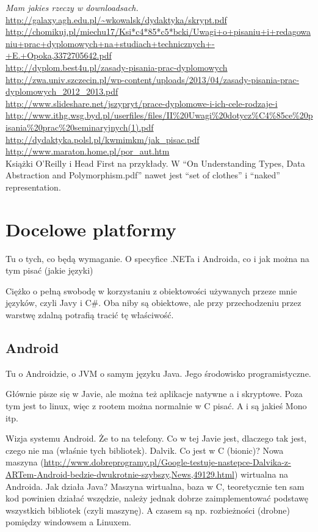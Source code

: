 \emph{Mam jakies rzeczy w downloadsach.} \\
\url{http://galaxy.agh.edu.pl/~wkowalsk/dydaktyka/skrypt.pdf}\\
\url{http://chomikuj.pl/miechu17/Ksi*c4*85*c5*bcki/Uwagi+o+pisaniu+i+redagowaniu+prac+dyplomowych+na+studiach+technicznych+-+E.+Opoka,3372705642.pdf}\\
\url{http://dyplom.best4u.pl/zasady-pisania-prac-dyplomowych}\\
\url{http://zwa.univ.szczecin.pl/wp-content/uploads/2013/04/zasady-pisania-prac-dyplomowych_2012_2013.pdf}\\
\url{http://www.slideshare.net/jszypryt/prace-dyplomowe-i-ich-cele-rodzaje-i}\\
\url{http://www.ithg.wsg.byd.pl/userfiles/files/II%20Uwagi%20dotycz%C4%85ce%20pisania%20prac%20seminaryjnych(1).pdf}\\
\url{http://dydaktyka.polsl.pl/kwmimkm/jak_pisac.pdf}\\
\url{http://www.maraton.home.pl/por_aut.htm}\\

Książki O'Reilly i Head First na przykłady. W ``On Understanding Types, Data Abstraction and Polymorphism.pdf'' nawet jest ``set of clothes'' i ``naked'' representation.

\section{Docelowe platformy}
Tu o tych, co będą wymaganie. O specyfice .NETa i Androida, co i jak można na tym pisać (jakie języki)

Ciężko o pełną swobodę w korzystaniu z obiektowości używanych przeze mnie języków, czyli Javy i C\#. Oba niby są obiektowe, ale przy przechodzeniu przez warstwę zdalną potrafią tracić tę właściwość.

\subsection{Android}
Tu o Androidzie, o JVM o samym języku Java. Jego środowisko programistyczne.

Głównie pisze się w Javie, ale można też aplikacje natywne a i skryptowe. Poza tym jest to linux, więc z rootem można normalnie w C pisać. A i są jakieś Mono itp.

Wizja systemu Android. Że to na telefony. Co w tej Javie jest, dlaczego tak jest, czego nie ma (właśnie tych bibliotek). Dalvik. Co jest w C (bionic)? Nowa maszyna (\url{http://www.dobreprogramy.pl/Google-testuje-nastepce-Dalvika-z-ARTem-Android-bedzie-dwukrotnie-szybszy,News,49129.html}) wirtualna na Androida.
Jak działa Java? Maszyna wirtualna, baza w C, teoretycznie ten sam kod powinien działać wszędzie, należy jednak dobrze zaimplementować podstawę wszystkich bibliotek (czyli maszynę). A czasem są np. rozbieżności (drobne) pomiędzy windowsem a Linuxem.

